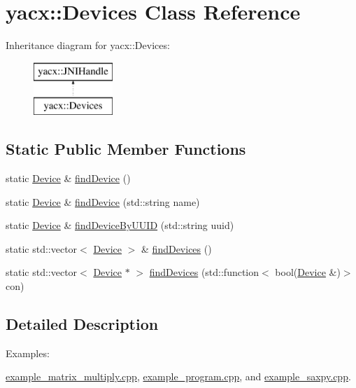 \hypertarget{classyacx_1_1_devices}{}\section{yacx\+:\+:Devices Class Reference}
\label{classyacx_1_1_devices}
Inheritance diagram for yacx\+:\+:Devices\+:\begin{figure}[H]
\begin{center}
\leavevmode
\includegraphics[height=2.000000cm]{classyacx_1_1_devices}
\end{center}
\end{figure}
\subsection*{Static Public Member Functions}
\begin{DoxyCompactItemize}
\item 
static \hyperlink{classyacx_1_1_device}{Device} \& \hyperlink{classyacx_1_1_devices_abaae9839d12e79117e2fb292ee0689fb}{find\+Device} ()
\item 
static \hyperlink{classyacx_1_1_device}{Device} \& \hyperlink{classyacx_1_1_devices_a89eb86ce0ad70dd0390375ee04f549f6}{find\+Device} (std\+::string name)
\item 
static \hyperlink{classyacx_1_1_device}{Device} \& \hyperlink{classyacx_1_1_devices_afbeb807ea9fac2ba0be9c4fa812c5243}{find\+Device\+By\+U\+U\+ID} (std\+::string uuid)
\item 
static std\+::vector$<$ \hyperlink{classyacx_1_1_device}{Device} $>$ \& \hyperlink{classyacx_1_1_devices_aa1a44930c265be1c6593af6c42cd9c12}{find\+Devices} ()
\item 
static std\+::vector$<$ \hyperlink{classyacx_1_1_device}{Device} $\ast$ $>$ \hyperlink{classyacx_1_1_devices_a274f530c0b46a7fcdd13d36b55330541}{find\+Devices} (std\+::function$<$ bool(\hyperlink{classyacx_1_1_device}{Device} \&)$>$ con)
\end{DoxyCompactItemize}


\subsection{Detailed Description}
\begin{Desc}
\item[Examples\+: ]\par
\hyperlink{example_matrix_multiply_8cpp-example}{example\+\_\+matrix\+\_\+multiply.\+cpp}, \hyperlink{example_program_8cpp-example}{example\+\_\+program.\+cpp}, and \hyperlink{example_saxpy_8cpp-example}{example\+\_\+saxpy.\+cpp}.\end{Desc}


